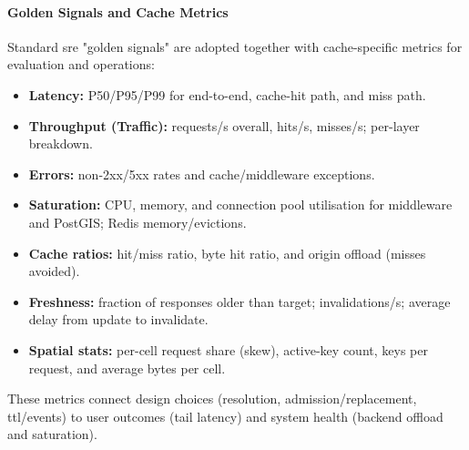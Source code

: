 \paragraph{Golden Signals and Cache Metrics}
Standard \ac{sre} "golden signals" are adopted together with cache-specific metrics for evaluation and operations:
\begin{itemize}
  \item \textbf{Latency:} P50/P95/P99 for end-to-end, cache-hit path, and miss path.
  \item \textbf{Throughput (Traffic):} requests/s overall, hits/s, misses/s; per-layer breakdown.
  \item \textbf{Errors:} non-2xx/5xx rates and cache/middleware exceptions.
  \item \textbf{Saturation:} CPU, memory, and connection pool utilisation for middleware and PostGIS; Redis memory/evictions.
  \item \textbf{Cache ratios:} hit/miss ratio, byte hit ratio, and origin offload (misses avoided).
  \item \textbf{Freshness:} fraction of responses older than target; invalidations/s; average delay from update to invalidate.
  \item \textbf{Spatial stats:} per-cell request share (skew), active-key count, keys per request, and average bytes per cell.
\end{itemize}
These metrics connect design choices (resolution, admission/replacement, \ac{ttl}/events) to user outcomes (tail latency) and system health (backend offload and saturation).
